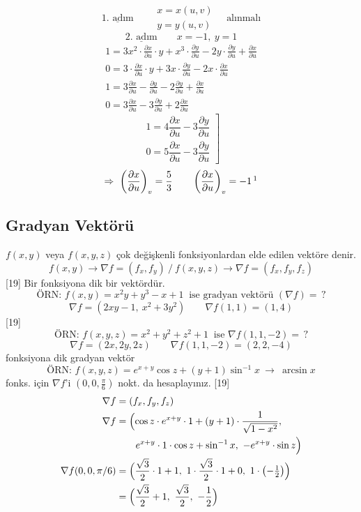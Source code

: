 \documentclass[11pt,a4paper]{article}
\begin{document}
\[ \underline{\text{1. adım}}\qquad\begin{array}{l}x=x(u,v)\\ y=y(u,v)\end{array}\quad\text{alınmalı} \]
\[ \underline{\text{2. adım}}\qquad x=-1,\ y=1 \]
\begin{gather*}
1=3x^2\cdot\frac{\partial x}{\partial u}\cdot y+x^3\cdot\frac{\partial y}{\partial u}-2y\cdot\frac{\partial y}{\partial u}+\frac{\partial x}{\partial u}\\
0=3\cdot\frac{\partial x}{\partial u}\cdot y+3x\cdot\frac{\partial y}{\partial u}-2x\cdot\frac{\partial x}{\partial u}\\
1=3\frac{\partial x}{\partial u}-\frac{\partial y}{\partial u}-2\frac{\partial y}{\partial u}+\frac{\partial x}{\partial u}\\
0=3\frac{\partial x}{\partial u}-3\frac{\partial y}{\partial u}+2\frac{\partial x}{\partial u}
\end{gather*}
\[ \left.\begin{array}{l}1=4\dfrac{\partial x}{\partial u}-3\dfrac{\partial y}{\partial u}\\[3mm] 0=5\dfrac{\partial x}{\partial u}-3\dfrac{\partial y}{\partial u}\end{array}\right] \]
\[ \Rightarrow\ \left(\frac{\partial x}{\partial u}\right)_v=\frac{5}{3}\qquad\left(\frac{\partial x}{\partial u}\right)_v=-1\,\footnotemark \]

\subsection{Gradyan Vektörü}
$f(x,y)$ veya $f(x,y,z)$ çok değişkenli fonksiyonlardan elde edilen vektöre denir.
\[ f(x,y)\to\nabla f=(f_x,f_y)\ \Big/\ f(x,y,z)\to\nabla f=(f_x,f_y,f_z) \]
[19]
Bir fonksiyona dik bir vektördür.
\[ \text{ÖRN: }f(x,y)=x^2y+y^3-x+1\ \text{ ise gradyan vektörü }(\nabla f)=\,? \]
\[ \nabla f=(2xy-1,\ x^2+3y^2)\qquad\nabla f(1,1)=(1,4) \]
[19]
\[ \text{ÖRN: }f(x,y,z)=x^2+y^2+z^2+1\ \text{ ise }\nabla f(1,1,-2)=\,? \]
\[ \nabla f=(2x,2y,2z)\qquad\nabla f(1,1,-2)=(2,2,-4) \]
fonksiyona dik gradyan vektör
\[ \text{ÖRN: }f(x,y,z)=e^{x+y}\cos z+(y+1)\sin^{-1}x\ \to\ \arcsin x \]
fonks. için $\nabla f$'i $\left(0,0,\frac{\pi}{6}\right)$ nokt. da hesaplayınız.
[19]
\begin{align*}
\nabla f&=(f_x,f_y,f_z)\\
\nabla f&=\Bigl(\cos z\cdot e^{x+y}\cdot1+(y+1)\cdot\frac{1}{\sqrt{1-x^2}},\\
&\qquad e^{x+y}\cdot1\cdot\cos z+\sin^{-1}x,\ -e^{x+y}\cdot\sin z\Bigr)\\
\nabla f(0,0,\pi/6)&=\Bigl(\frac{\sqrt3}{2}\cdot1+1,\ 1\cdot\frac{\sqrt3}{2}\cdot1+0,\ 1\cdot\bigl(-\tfrac12\bigr)\Bigr)\\
&=\Bigl(\frac{\sqrt3}{2}+1,\ \frac{\sqrt3}{2},\ -\frac12\Bigr)
\end{align*}
\end{document}
